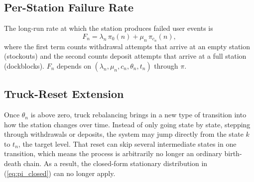 \documentclass[conference]{IEEEtran}
\begin{document}
\subsection{Per-Station Failure Rate}

The long-run rate at which the station produces failed user events is
\begin{equation}\label{eq:Fn}
F_n = \lambda_n \, \pi_0(n) + \mu_n \, \pi_{c_n}(n),
\end{equation}
where the first term counts withdrawal attempts that arrive at an empty station (stockouts) and the second counts deposit attempts that arrive at a full station (dockblocks). $F_n$ depends on $(\lambda_n, \mu_n, c_n, \theta_n, t_n)$ through $\pi$.
 


\subsection{Truck-Reset Extension}

Once $\theta_n$ is above zero, truck rebalancing brings in a new type of transition into how the station changes over time. Instead of only going state by state, stepping through withdrawals or deposits, the system may jump directly from the state $k$ to $t_n$, the target level. That reset can skip several intermediate states in one transition, which means the process is arbitrarily no longer an ordinary birth-death chain. As a result, the closed-form stationary distribution in (\ref{eq:pi_closed}) can no longer apply.
\end{document}
